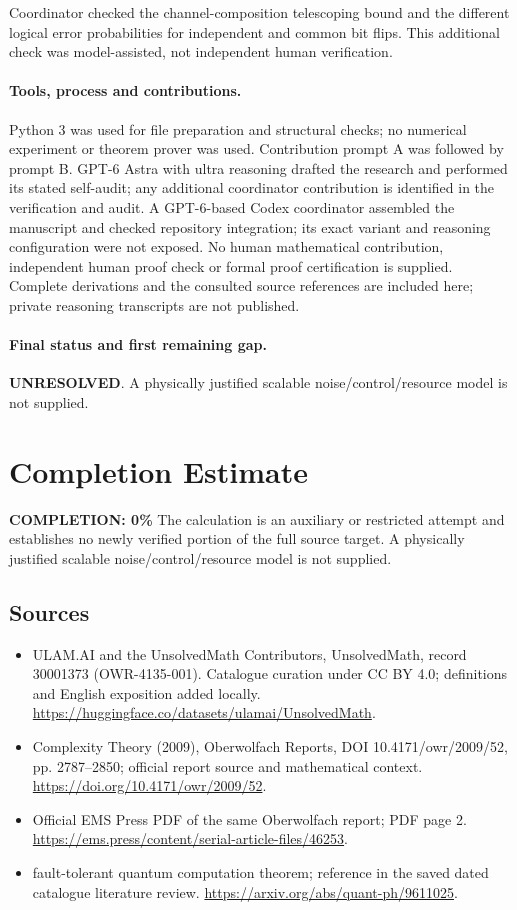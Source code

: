 \documentclass[11pt]{article}
\begin{document}
Coordinator checked the channel-composition telescoping bound and the different logical error probabilities for independent and common bit flips. This additional check was model-assisted, not independent human verification.

\paragraph{Tools, process and contributions.}
Python 3 was used for file preparation and structural checks; no numerical experiment or theorem prover was used. Contribution prompt A was followed by prompt B. GPT-6 Astra with ultra reasoning drafted the research and performed its stated self-audit; any additional coordinator contribution is identified in the verification and audit. A GPT-6-based Codex coordinator assembled the manuscript and checked repository integration; its exact variant and reasoning configuration were not exposed. No human mathematical contribution, independent human proof check or formal proof certification is supplied. Complete derivations and the consulted source references are included here; private reasoning transcripts are not published.

\paragraph{Final status and first remaining gap.}
\textbf{UNRESOLVED}. A physically justified scalable noise/control/resource model is not supplied.

\section{Completion Estimate}
\noindent\textbf{COMPLETION: 0\%}
The calculation is an auxiliary or restricted attempt and establishes no newly verified portion of the full source target. A physically justified scalable noise/control/resource model is not supplied.

\subsection{Sources}
\begin{itemize}
\item[\hypertarget{source:30001373:1}{S1}] ULAM.AI and the UnsolvedMath Contributors, UnsolvedMath, record 30001373 (OWR-4135-001). Catalogue curation under CC BY 4.0; definitions and English exposition added locally.
\url{https://huggingface.co/datasets/ulamai/UnsolvedMath}.
\item[\hypertarget{source:30001373:2}{S2}] Complexity Theory (2009), Oberwolfach Reports, DOI 10.4171/owr/2009/52, pp. 2787--2850; official report source and mathematical context.
\url{https://doi.org/10.4171/owr/2009/52}.
\item[\hypertarget{source:30001373:3}{S3}] Official EMS Press PDF of the same Oberwolfach report; PDF page 2.
\url{https://ems.press/content/serial-article-files/46253}.
\item[\hypertarget{source:30001373:4}{S4}] fault-tolerant quantum computation theorem; reference in the saved dated catalogue literature review.
\url{https://arxiv.org/abs/quant-ph/9611025}.
\end{itemize}
\label{end:30001373}
\end{document}
